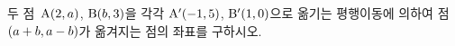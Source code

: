 두 점~$\mathrm{A}(2{,}\mkern3mu\mathopen{}a)$, $\mathrm{B}(b{,}\mkern3mu\mathopen{}3)$을 각각 $\mathrm{A}'(-1{,}\mkern3mu\mathopen{}5)$, $\mathrm{B}'(1{,}\mkern3mu\mathopen{}0)$으로 옮기는 평행이동에 의하여 점~$(a+b{,}\mkern3mu\mathopen{}a-b)$가 옮겨지는 점의 좌표를 구하시오.
